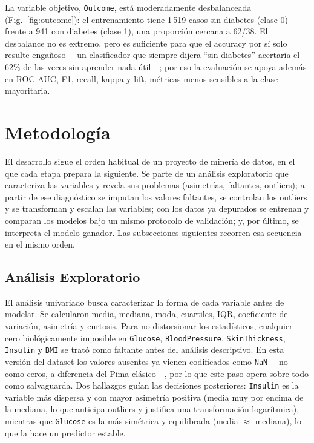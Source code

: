 \documentclass[conference]{IEEEtran}
\newcommand{\code}[1]{\texttt{#1}}
\begin{document}
La variable objetivo, \code{Outcome}, está moderadamente desbalanceada (Fig.~\ref{fig:outcome}): el entrenamiento tiene 1\,519 casos sin diabetes (clase 0) frente a 941 con diabetes (clase 1), una proporción cercana a 62/38. El desbalance no es extremo, pero es suficiente para que el accuracy por sí solo resulte engañoso ---un clasificador que siempre dijera ``sin diabetes'' acertaría el 62\% de las veces sin aprender nada útil---; por eso la evaluación se apoya además en ROC AUC, F1, recall, kappa y lift, métricas menos sensibles a la clase mayoritaria.

\section{Metodología}

El desarrollo sigue el orden habitual de un proyecto de minería de datos, en el que cada etapa prepara la siguiente. Se parte de un análisis exploratorio que caracteriza las variables y revela sus problemas (asimetrías, faltantes, outliers); a partir de ese diagnóstico se imputan los valores faltantes, se controlan los outliers y se transforman y escalan las variables; con los datos ya depurados se entrenan y comparan los modelos bajo un mismo protocolo de validación; y, por último, se interpreta el modelo ganador. Las subsecciones siguientes recorren esa secuencia en el mismo orden.

\subsection{Análisis Exploratorio}

El análisis univariado busca caracterizar la forma de cada variable antes de modelar. Se calcularon media, mediana, moda, cuartiles, IQR, coeficiente de variación, asimetría y curtosis. Para no distorsionar los estadísticos, cualquier cero biológicamente imposible en \code{Glucose}, \code{BloodPressure}, \code{SkinThickness}, \code{Insulin} y \code{BMI} se trató como faltante antes del análisis descriptivo. En esta versión del dataset los valores ausentes ya vienen codificados como \code{NaN} ---no como ceros, a diferencia del Pima clásico---, por lo que este paso opera sobre todo como salvaguarda. Dos hallazgos guían las decisiones posteriores: \code{Insulin} es la variable más dispersa y con mayor asimetría positiva (media muy por encima de la mediana, lo que anticipa outliers y justifica una transformación logarítmica), mientras que \code{Glucose} es la más simétrica y equilibrada (media $\approx$ mediana), lo que la hace un predictor estable.
\end{document}
